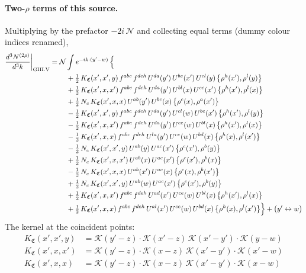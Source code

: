 \documentclass[10pt]{article}
\numberwithin{equation}{section}
\newcommand{\KK}{\mathcal K}
\newcommand{\NN}{\mathcal N}
\begin{document}
\paragraph{Two-$\rho$ terms of this source.} Multiplying by the prefactor $-2i\,\NN$ and collecting equal terms (dummy colour indices renamed),
\begin{align}
\frac{d^3N^{(2\rho)}}{d^3k}\bigg|_{\rm GIII.V}={}&\NN\int e^{-ik\cdot(y'-w)}\,\Big\{\notag\\
&\quad +\tfrac12\,K_{\mathfrak C}(x',x',y)\,f^{abc}\,f^{deh}\,U^{da}(y')\,U^{be}(x')\,U^{cl}(y)\,\big\{\rho^{h}(x'),\rho^{l}(y)\big\}\notag\\
&\quad +\tfrac12\,K_{\mathfrak C}(x',x,x')\,f^{abc}\,f^{deh}\,U^{da}(y')\,U^{bl}(x)\,U^{ce}(x')\,\big\{\rho^{h}(x'),\rho^{l}(x)\big\}\notag\\
&\quad +\tfrac12\,N_{c}\,K_{\mathfrak C}(x',x,x)\,U^{ab}(y')\,U^{bc}(x)\,\big\{\rho^{c}(x),\rho^{a}(x')\big\}\notag\\
&\quad -\tfrac12\,K_{\mathfrak C}(x',x',y)\,f^{abc}\,f^{deh}\,U^{da}(y')\,U^{cl}(w)\,U^{be}(x')\,\big\{\rho^{h}(x'),\rho^{l}(y)\big\}\notag\\
&\quad -\tfrac12\,K_{\mathfrak C}(x',x,x')\,f^{abc}\,f^{deh}\,U^{da}(y')\,U^{ce}(w)\,U^{bl}(x)\,\big\{\rho^{h}(x'),\rho^{l}(x)\big\}\notag\\
&\quad -\tfrac12\,K_{\mathfrak C}(x',x,x)\,f^{abc}\,f^{deh}\,U^{la}(y')\,U^{ce}(w)\,U^{bd}(x)\,\big\{\rho^{h}(x),\rho^{l}(x')\big\}\notag\\
&\quad -\tfrac12\,N_{c}\,K_{\mathfrak C}(x',x',y)\,U^{ab}(y)\,U^{ac}(x')\,\big\{\rho^{c}(x'),\rho^{b}(y)\big\}\notag\\
&\quad +\tfrac12\,N_{c}\,K_{\mathfrak C}(x',x,x')\,U^{ab}(x)\,U^{ac}(x')\,\big\{\rho^{c}(x'),\rho^{b}(x)\big\}\notag\\
&\quad -\tfrac12\,N_{c}\,K_{\mathfrak C}(x',x,x)\,U^{ab}(x')\,U^{ac}(x)\,\big\{\rho^{c}(x),\rho^{b}(x')\big\}\notag\\
&\quad +\tfrac12\,N_{c}\,K_{\mathfrak C}(x',x',y)\,U^{ab}(w)\,U^{ac}(x')\,\big\{\rho^{c}(x'),\rho^{b}(y)\big\}\notag\\
&\quad +\tfrac12\,K_{\mathfrak C}(x',x,x')\,f^{abc}\,f^{deh}\,U^{ad}(x')\,U^{ce}(w)\,U^{bl}(x)\,\big\{\rho^{h}(x'),\rho^{l}(x)\big\}\notag\\
&\quad +\tfrac12\,K_{\mathfrak C}(x',x,x)\,f^{abc}\,f^{deh}\,U^{al}(x')\,U^{ce}(w)\,U^{bd}(x)\,\big\{\rho^{h}(x),\rho^{l}(x')\big\}\Big\}+\big(y'\leftrightarrow w\big)\label{R:eq:res-GIII.V}
\end{align}
The kernel at the coincident points:
\begin{align*}
K_{\mathfrak C}(x',x',y)&=\KK(y'-z)\cdot\KK(x'-z)\,\KK(x'-y')\cdot\KK(y-w)\\K_{\mathfrak C}(x',x,x')&=\KK(y'-z)\cdot\KK(x-z)\,\KK(x'-y')\cdot\KK(x'-w)\\K_{\mathfrak C}(x',x,x)&=\KK(y'-z)\cdot\KK(x-z)\,\KK(x'-y')\cdot\KK(x-w)
\end{align*}
\end{document}
